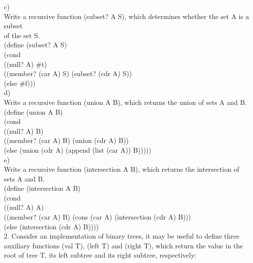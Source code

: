 \documentclass[12pt]{article}
\begin{document}
\begin{flushleft}
\qquad c)\\
\qquad \qquad Write a recursive function (subset? A S), which determines whether the set A is a subset\\
\qquad \qquad of the set S. \\
[2mm] 

\qquad \qquad \qquad (define (subset? A S)\\
\qquad \qquad \qquad \qquad (cond\\
\qquad \qquad \qquad \qquad \qquad ((null? A) \#t)\\
\qquad \qquad \qquad \qquad \qquad ((member? (car A) S) (subset? (cdr A) S))\\
\qquad \qquad \qquad \qquad \qquad (else \#f)))\\

\qquad d)\\
\qquad \qquad Write a recursive function (union A B), which returns the union of sets A and B.\\
[2mm]  

\qquad \qquad \qquad (define (union A B)\\
\qquad \qquad \qquad \qquad (cond\\
\qquad \qquad \qquad \qquad \qquad ((null? A) B)\\
\qquad \qquad \qquad \qquad \qquad ((member? (car A) B) (union (cdr A) B))\\
\qquad \qquad \qquad \qquad \qquad (else (union (cdr A) (append (list (car A)) B)))))\\
[30mm]

\qquad e)\\
\qquad \qquad Write a recursive function (intersection  A  B), which returns the intersection of sets A and B.\\
[2mm]

\qquad \qquad \qquad (define (intersection A B)\\
\qquad \qquad \qquad \qquad (cond\\
\qquad \qquad \qquad \qquad \qquad ((null? A) A)\\
\qquad \qquad \qquad \qquad \qquad ((member? (car A) B) (cons (car A) (intersection (cdr A) B)))\\
\qquad \qquad \qquad \qquad \qquad (else (intersection (cdr A) B))))\\  
[2mm]

2.  Consider an implementation of binary trees, it may be useful to define three auxiliary functions (val  T), (left T) and (right T), which return the value in the root of tree T, its left subtree and its right subtree, respectively:\\  
[2mm]


\end{flushleft}
\end{document}
